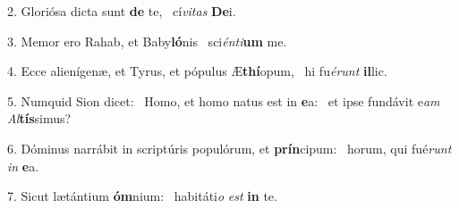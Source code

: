 2. Gloriósa dicta sunt \textbf{de} te, \ast\  cí\textit{vi}\textit{tas} \textbf{De}i.\

3. Memor ero Rahab, et Baby\textbf{ló}nis \ast\  sci\textit{én}\textit{ti}\textbf{um} me.\

4. Ecce alienígenæ, et Tyrus, et pópulus Æ\textbf{thí}opum, \ast\  hi fu\textit{é}\textit{runt} \textbf{il}lic.\

5. Numquid Sion dicet: \dag\  Homo, et homo natus est in \textbf{e}a: \ast\  et ipse fundávit e\textit{am} \textit{Al}\textbf{tís}simus?\

6. Dóminus narrábit in scriptúris populórum, et \textbf{prín}cipum: \ast\  horum, qui fué\textit{runt} \textit{in} \textbf{e}a.\

7. Sicut lætántium \textbf{óm}nium: \ast\  habitáti\textit{o} \textit{est} \textbf{in} te.\


